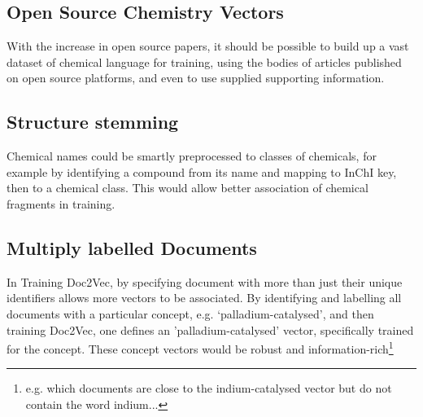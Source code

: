 \subsection{Open Source Chemistry Vectors}
With the increase in open source papers, it should be possible to build up a vast dataset of chemical language for training, using the bodies of articles published on open source platforms, and even to use supplied supporting information. 
\subsection{Structure stemming}
Chemical names could be smartly preprocessed to classes of chemicals, for example by identifying a compound from its name and mapping to InChI key, then to a chemical class. This would allow better association of chemical fragments in training.
\subsection{Multiply labelled Documents}
In Training Doc2Vec, by specifying document with more than just their unique identifiers allows more vectors to be associated. By identifying and labelling all documents with a particular concept, e.g. `palladium-catalysed', and then training Doc2Vec, one defines an 'palladium-catalysed' vector, specifically trained for the concept. These concept vectors would be robust and information-rich\footnote{e.g. which documents are close to the indium-catalysed vector but do not contain the word indium...}